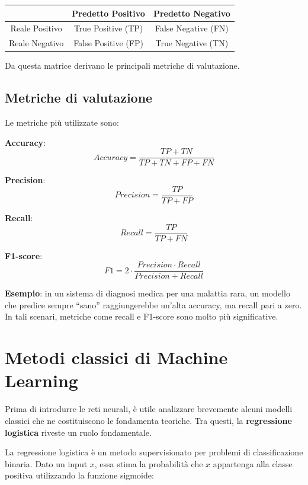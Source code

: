 \begin{center}
\begin{tabular}{|c|c|c|}
\hline
 & Predetto Positivo & Predetto Negativo \\
\hline
Reale Positivo & True Positive (TP) & False Negative (FN) \\
\hline
Reale Negativo & False Positive (FP) & True Negative (TN) \\
\hline
\end{tabular}
\end{center}
Da questa matrice derivano le principali metriche di valutazione.


\subsection{Metriche di valutazione}
Le metriche più utilizzate sono:

\begin{compactitemize}
    \item \textbf{Accuracy}:
    \[
    Accuracy = \frac{TP + TN}{TP + TN + FP + FN}
    \]

    \item \textbf{Precision}:
    \[
    Precision = \frac{TP}{TP + FP}
    \]

    \item \textbf{Recall}:
    \[
    Recall = \frac{TP}{TP + FN}
    \]

    \item \textbf{F1-score}:
    \[
    F1 = 2 \cdot \frac{Precision \cdot Recall}{Precision + Recall}
    \]
\end{compactitemize}

\textbf{Esempio}: in un sistema di diagnosi medica per una malattia rara, un modello che predice sempre “sano” raggiungerebbe un’alta accuracy, ma recall pari a zero. In tali scenari, metriche come recall e F1-score sono molto più significative.


\section{Metodi classici di Machine Learning}
Prima di introdurre le reti neurali, è utile analizzare brevemente alcuni modelli classici che ne costituiscono le fondamenta teoriche. Tra questi, la \textbf{regressione logistica} riveste un ruolo fondamentale. 

La regressione logistica è un metodo supervisionato per problemi di classificazione binaria. Dato un input $x$, essa stima la probabilità che $x$ appartenga alla classe positiva utilizzando la funzione sigmoide:

